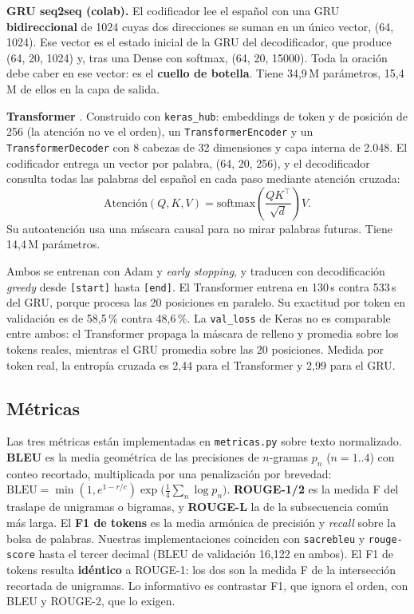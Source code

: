 \documentclass[12pt,a4paper]{article}
\begin{document}
\textbf{GRU seq2seq (colab).} El codificador lee el español con una GRU \textbf{bidireccional} de 1024 cuyas dos
direcciones se suman en un único vector, (64, 1024). Ese vector es el estado inicial de la GRU del
decodificador, que produce (64, 20, 1024) y, tras una Dense con softmax, (64, 20, 15000). Toda la oración
debe caber en ese vector: es el \textbf{cuello de botella}. Tiene 34,9\,M parámetros, 15,4\,M de ellos en la
capa de salida.

\textbf{Transformer} \cite{vaswani}. Construido con \texttt{keras\_hub}: embeddings de token y de posición
de 256 (la atención no ve el orden), un \texttt{TransformerEncoder} y un \texttt{TransformerDecoder}
con 8 cabezas de 32 dimensiones y capa interna de 2.048. El codificador entrega un vector por palabra,
(64, 20, 256), y el decodificador consulta todas las palabras del español en cada paso mediante atención cruzada:
\[
\mathrm{Atención}(Q,K,V) = \mathrm{softmax}\!\left(\frac{QK^{\top}}{\sqrt{d}}\right)V .
\]
Su autoatención usa una máscara causal para no mirar palabras futuras. Tiene 14,4\,M parámetros.

Ambos se entrenan con Adam y \emph{early stopping}, y traducen con decodificación \emph{greedy} desde
\texttt{[start]} hasta \texttt{[end]}. El Transformer entrena en 130\,s contra 533\,s del GRU, porque procesa
las 20 posiciones en paralelo. Su exactitud por token en validación es de 58,5\,\% contra 48,6\,\%.
La \texttt{val\_loss} de Keras no es comparable entre ambos: el Transformer propaga la máscara de relleno y
promedia sobre los tokens reales, mientras el GRU promedia sobre las 20 posiciones. Medida por token real,
la entropía cruzada es 2,44 para el Transformer y 2,99 para el GRU.

\subsection{Métricas}

Las tres métricas están implementadas en \texttt{metricas.py} sobre texto normalizado.
\textbf{BLEU} \cite{bleu} es la media geométrica de las precisiones de $n$-gramas $p_n$ ($n=1..4$) con conteo
recortado, multiplicada por una penalización por brevedad:
$\mathrm{BLEU}=\min\!\left(1,e^{1-r/c}\right)\exp\!\big(\tfrac14\sum_{n}\log p_n\big)$.
\textbf{ROUGE-1/2} \cite{rouge} es la medida F del traslape de unigramas o bigramas, y \textbf{ROUGE-L}
la de la subsecuencia común más larga. El \textbf{F1 de tokens} es la media armónica de precisión y
\emph{recall} sobre la bolsa de palabras. Nuestras implementaciones coinciden con \texttt{sacrebleu} y
\texttt{rouge-score} hasta el tercer decimal (BLEU de validación 16,122 en ambos). El F1 de tokens resulta
\textbf{idéntico} a ROUGE-1: los dos son la medida F de la intersección recortada de unigramas. Lo
informativo es contrastar F1, que ignora el orden, con BLEU y ROUGE-2, que lo exigen.
\end{document}
